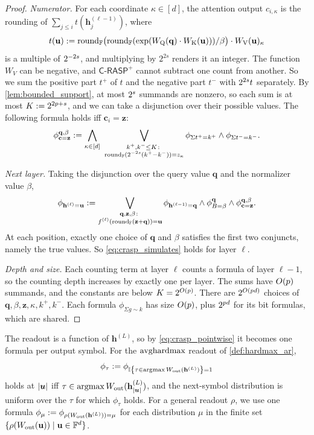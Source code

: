 \begin{proof}
\emph{Numerator.} For each coordinate $\kappa\in[d]$, the attention output $c_{i,\kappa}$ is the rounding of $\sum_{j\leq i}t(\mathbf{h}^{(\ell-1)}_j)$, where
\[
t(\mathbf{u}) := \textnormal{round}_{\mathbb{F}}\bigl(\textnormal{round}_{\mathbb{F}}(\exp(W_{\textnormal{Q}}(\mathbf{q})\cdot W_{\textnormal{K}}(\mathbf{u})))/\beta\bigr)\cdot W_{\textnormal{V}}(\mathbf{u})_\kappa
\]
is a multiple of $2^{-2{s}}$, and multiplying by $2^{2s}$ renders it an integer. The function $W_V$ can be negative, and $\mathsf{C\text{-}RASP}^+$ cannot subtract one count from another.
So we sum the positive part $t^+$ of $t$ and the negative part $t^-$ with $2^{2{s}}t$ separately.
By \cref{lem:bounded_support}, at most $2^{{s}}$ summands are nonzero, so each sum is at most $K:=2^{2{p}+{s}}$,
and we can take a disjunction over their possible values. The following formula holds iff $\mathbf{c}_i=\mathbf{z}$:
\[
\phi^{\mathbf{q},\beta}_{\mathbf{c}=\mathbf{z}} := \bigwedge_{\kappa\in[d]}\ \bigvee_{\substack{k^+,k^-\leq K\colon\\ \textnormal{round}_{\mathbb{F}}(2^{-2{s}}(k^+-k^-))=z_\kappa}}
\phi_{\Sigma t^+=k^+}\land\phi_{\Sigma t^-=k^-}.
\]

\emph{Next layer.} Taking the disjunction over the query value $\mathbf{q}$ and the normalizer value $\beta$,
\[
\phi_{\mathbf{h}^{(\ell)}=\mathbf{u}} := \bigvee_{\substack{\mathbf{q},\mathbf{z},\beta\colon\\ f^{(\ell)}(\textnormal{round}_{\mathbb{F}}(\mathbf{z}+\mathbf{q}))=\mathbf{u}}}
\phi_{\mathbf{h}^{(\ell-1)}=\mathbf{q}}\land\phi^{\mathbf{q}}_{B=\beta}\land\phi^{\mathbf{q},\beta}_{\mathbf{c}=\mathbf{z}}.
\]
At each position, exactly one choice of $\mathbf{q}$ and $\beta$ satisfies the first two conjuncts, namely the true values.
So \cref{eq:crasp_simulates} holds for layer $\ell$.


\emph{Depth and size.} Each counting term at layer $\ell$ counts a formula of layer $\ell-1$, so the counting depth increases by exactly one per layer.
The sums have $O({p})$ summands, and the constants are below $K=2^{O({p})}$.
There are $2^{O({p} d)}$ choices of $\mathbf{q},\beta,\mathbf{z},\kappa,k^+,k^-$. Each formula $\phi_{\Sigma g\sim k}$ has size
$O({p})$, plus $2^{{p} d}$ for its bit formulas, which are shared.
\end{proof}

The readout is a function of $\mathbf{h}^{(L)}$, so by \cref{eq:crasp_pointwise} it becomes one formula per output symbol.
For the $\mathrm{avghardmax}$ readout of \cref{def:hardmax_ar},
\[
\phi_\tau := \phi_{\mathbb{I} \left\{ \tau\in\operatorname*{{{ argmax}}}W_{\textnormal{out}}(\mathbf{h}^{(L)}) \right\}=1}
\]
holds at $|{{\boldsymbol{u}}}|$ iff $\tau\in\operatorname*{{{ argmax}}}W_{\textnormal{out}}(\mathbf{h}^{(L)}_{|{{\boldsymbol{u}}}|})$, and the next-symbol distribution is uniform over the $\tau$ for which $\phi_\tau$ holds.
For a general readout $\rho$, we use one formula $\phi_\mu := \phi_{\rho(W_{\textnormal{out}}(\mathbf{h}^{(L)}))=\mu}$ for each distribution $\mu$ in the finite set $\{\rho(W_{\textnormal{out}}(\mathbf{u}))\mid\mathbf{u}\in\mathbb{F}^d\}$.


